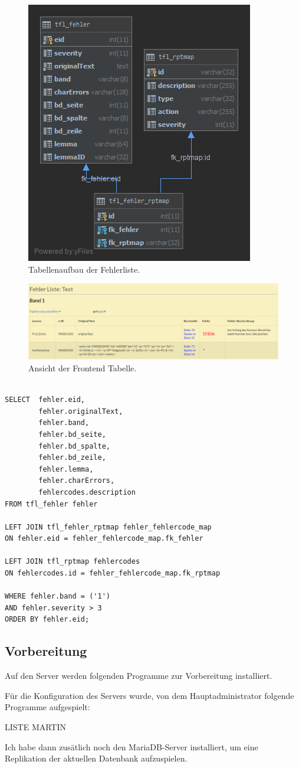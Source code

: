 \begin{figure}
	\centering
	\includegraphics[width=0.5\linewidth]{images/structure_errormodule.png}
	\caption{Tabellenaufbau der Fehlerliste.}
	\label{img:errorListStructure}
\end{figure}

\begin{figure}
	\centering
	\includegraphics[width=1\linewidth]{images/errormodule_sample.png}
	\caption{Ansicht der Frontend Tabelle.}
	\label{img:errorListSample}
\end{figure}

\lstset{language=SQL}
\begin{lstlisting}[frame=single]  % Start your code-block

SELECT  fehler.eid,
        fehler.originalText,
        fehler.band,
        fehler.bd_seite,
        fehler.bd_spalte,
        fehler.bd_zeile,
        fehler.lemma,
        fehler.charErrors,
        fehlercodes.description
FROM tfl_fehler fehler

LEFT JOIN tfl_fehler_rptmap fehler_fehlercode_map 
ON fehler.eid = fehler_fehlercode_map.fk_fehler

LEFT JOIN tfl_rptmap fehlercodes 
ON fehlercodes.id = fehler_fehlercode_map.fk_rptmap

WHERE fehler.band = ('1')
AND fehler.severity > 3
ORDER BY fehler.eid;
\end{lstlisting}

\subsection{Vorbereitung}

Auf den Server werden folgenden Programme zur Vorbereitung installiert.

Für die Konfiguration des Servers wurde, von dem Hauptadministrator folgende Programme aufgespielt:

LISTE MARTIN

Ich habe dann zusätlich noch den MariaDB-Server installiert, um eine Replikation der aktuellen Datenbank aufzuspielen.